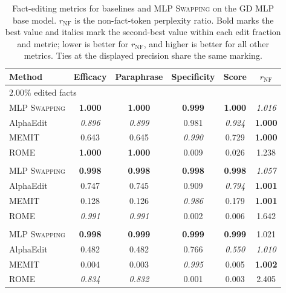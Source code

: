 \begin{table}[h]
\centering
\scriptsize
\setlength{\tabcolsep}{5pt}
\begin{tabular}{lccccc}
\toprule
Method & Efficacy & Paraphrase & Specificity & Score & \(r_{\mathrm{NF}}\) \\
\midrule
\multicolumn{6}{l}{\(2.00\%\) edited facts} \\
\quad \textsc{MLP Swapping} & \textbf{1.000} & \textbf{1.000} & \textbf{0.999} & \textbf{1.000} & \emph{1.016} \\
\quad AlphaEdit & \emph{0.896} & \emph{0.899} & 0.981 & \emph{0.924} & \textbf{1.000} \\
\quad MEMIT & 0.643 & 0.645 & \emph{0.990} & 0.729 & \textbf{1.000} \\
\quad ROME & \textbf{1.000} & \textbf{1.000} & 0.009 & 0.026 & 1.238 \\
\addlinespace
\multicolumn{6}{l}{\(5.00\%\) edited facts} \\
\quad \textsc{MLP Swapping} & \textbf{0.998} & \textbf{0.998} & \textbf{0.998} & \textbf{0.998} & \emph{1.057} \\
\quad AlphaEdit & 0.747 & 0.745 & 0.909 & \emph{0.794} & \textbf{1.001} \\
\quad MEMIT & 0.128 & 0.126 & \emph{0.986} & 0.179 & \textbf{1.001} \\
\quad ROME & \emph{0.991} & \emph{0.991} & 0.002 & 0.006 & 1.642 \\
\addlinespace
\multicolumn{6}{l}{\(10.00\%\) edited facts} \\
\quad \textsc{MLP Swapping} & \textbf{0.998} & \textbf{0.999} & \textbf{0.999} & \textbf{0.999} & 1.021 \\
\quad AlphaEdit & 0.482 & 0.482 & 0.766 & \emph{0.550} & \emph{1.010} \\
\quad MEMIT & 0.004 & 0.003 & \emph{0.995} & 0.005 & \textbf{1.002} \\
\quad ROME & \emph{0.834} & \emph{0.832} & 0.001 & 0.003 & 2.405 \\
\bottomrule
\end{tabular}
\caption{Fact-editing metrics for baselines and \textsc{MLP Swapping} on the GD MLP base model.
\(r_{\mathrm{NF}}\) is the non-fact-token perplexity ratio.
Bold marks the best value and italics mark the second-best value within each edit fraction and metric; lower is better
for \(r_{\mathrm{NF}}\), and higher is better for all other metrics.
Ties at the displayed precision share the same marking.}
\label{tab:fact-editing-updated-h512}
\end{table}

